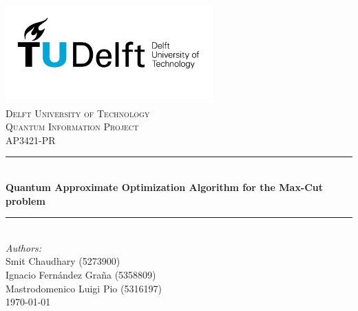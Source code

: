 \begin{titlepage}

\newcommand{\HRule}{\rule{\linewidth}{0.5mm}} 							%
\center 
 \includegraphics[width=0.6\textwidth]{images/TU_delft_logo.jpg}\\[1cm]   %
\textsc{\LARGE Delft University of Technology}\\[1cm]

\textsc{\Large Quantum Information Project}\\[0.2cm]
\textsc{\large AP3421-PR}\\[1cm] 										%
\HRule \\[0.8cm]
{ \huge \bfseries Quantum Approximate Optimization Algorithm for the Max-Cut problem}\\[0.7cm]								%
\HRule \\[2cm]
\large
\emph{Authors:}\\Smit Chaudhary (5273900)\\Ignacio Fernández Graña (5358809)\\Mastrodomenico Luigi Pio (5316197)\\[1.5cm]												
{\large \today}\\[5cm]

\vfill 

\end{titlepage}